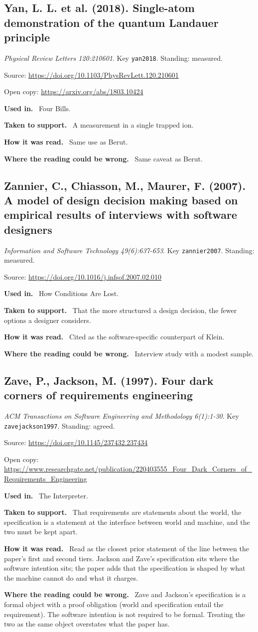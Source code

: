 \documentclass[11pt,oneside]{article}
\newcommand{\field}[1]{\par\noindent\textbf{\color{accent}#1.}\ }
\begin{document}
\hypertarget{src:yan2018}{}
\subsection*{Yan, L. L. et al. (2018). Single-atom demonstration of the quantum Landauer principle}
\noindent\small\emph{Physical Review Letters 120:210601}. Key \texttt{yan2018}. Standing: measured.
\par\noindent\small Source: \url{https://doi.org/10.1103/PhysRevLett.120.210601}
\par\noindent\small Open copy: \url{https://arxiv.org/abs/1803.10424}
\normalsize
\field{Used in} Four Bills.
\field{Taken to support} A measurement in a single trapped ion.
\field{How it was read} Same use as Berut.
\field{Where the reading could be wrong} Same caveat as Berut.

\hypertarget{src:zannier2007}{}
\subsection*{Zannier, C., Chiasson, M., Maurer, F. (2007). A model of design decision making based on empirical results of interviews with software designers}
\noindent\small\emph{Information and Software Technology 49(6):637-653}. Key \texttt{zannier2007}. Standing: measured.
\par\noindent\small Source: \url{https://doi.org/10.1016/j.infsof.2007.02.010}
\normalsize
\field{Used in} How Conditions Are Lost.
\field{Taken to support} That the more structured a design decision, the fewer options a designer considers.
\field{How it was read} Cited as the software-specific counterpart of Klein.
\field{Where the reading could be wrong} Interview study with a modest sample.

\hypertarget{src:zavejackson1997}{}
\subsection*{Zave, P., Jackson, M. (1997). Four dark corners of requirements engineering}
\noindent\small\emph{ACM Transactions on Software Engineering and Methodology 6(1):1-30}. Key \texttt{zavejackson1997}. Standing: agreed.
\par\noindent\small Source: \url{https://doi.org/10.1145/237432.237434}
\par\noindent\small Open copy: \url{https://www.researchgate.net/publication/220403555_Four_Dark_Corners_of_Requirements_Engineering}
\normalsize
\field{Used in} The Interpreter.
\field{Taken to support} That requirements are statements about the world, the specification is a statement at the interface between world and machine, and the two must be kept apart.
\field{How it was read} Read as the closest prior statement of the line between the paper's first and second tiers. Jackson and Zave's specification sits where the software intention sits; the paper adds that the specification is shaped by what the machine cannot do and what it charges.
\field{Where the reading could be wrong} Zave and Jackson's specification is a formal object with a proof obligation (world and specification entail the requirement). The software intention is not required to be formal. Treating the two as the same object overstates what the paper has.
\end{document}
